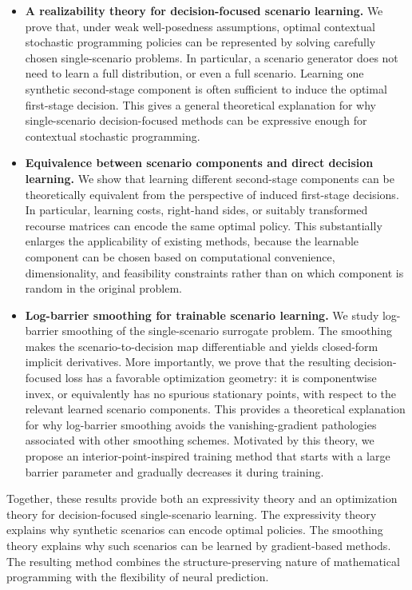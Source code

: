 \begin{itemize}
    \item \textbf{A realizability theory for decision-focused scenario learning.}
    We prove that, under weak well-posedness assumptions, optimal contextual stochastic programming policies can be represented by solving carefully chosen single-scenario problems. In particular, a scenario generator does not need to learn a full distribution, or even a full scenario. Learning one synthetic second-stage component is often sufficient to induce the optimal first-stage decision. This gives a general theoretical explanation for why single-scenario decision-focused methods can be expressive enough for contextual stochastic programming.

    \item \textbf{Equivalence between scenario components and direct decision learning.}
    We show that learning different second-stage components can be theoretically equivalent from the perspective of induced first-stage decisions. In particular, learning costs, right-hand sides, or suitably transformed recourse matrices can encode the same optimal policy. This substantially enlarges the applicability of existing methods, because the learnable component can be chosen based on computational convenience, dimensionality, and feasibility constraints rather than on which component is random in the original problem.

    \item \textbf{Log-barrier smoothing for trainable scenario learning.}
    We study log-barrier smoothing of the single-scenario surrogate problem. The smoothing makes the scenario-to-decision map differentiable and yields closed-form implicit derivatives. More importantly, we prove that the resulting decision-focused loss has a favorable optimization geometry: it is componentwise invex, or equivalently has no spurious stationary points, with respect to the relevant learned scenario components. This provides a theoretical explanation for why log-barrier smoothing avoids the vanishing-gradient pathologies associated with other smoothing schemes. Motivated by this theory, we propose an interior-point-inspired training method that starts with a large barrier parameter and gradually decreases it during training.
\end{itemize}

Together, these results provide both an expressivity theory and an optimization theory for decision-focused single-scenario learning. The expressivity theory explains why synthetic scenarios can encode optimal policies. The smoothing theory explains why such scenarios can be learned by gradient-based methods. The resulting method combines the structure-preserving nature of mathematical programming with the flexibility of neural prediction.

